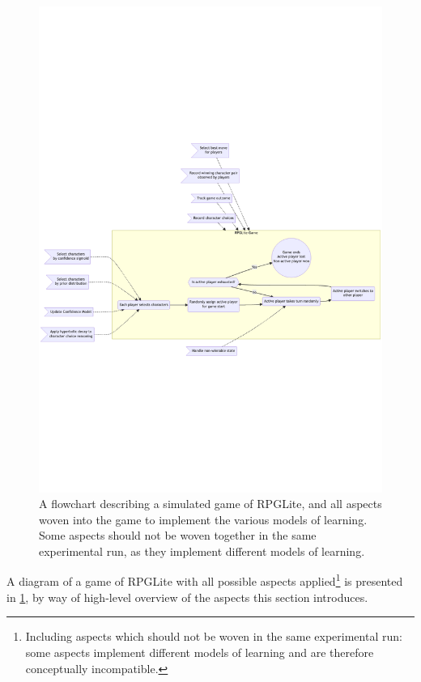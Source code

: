 \begin{figure}
  \centering
  \includegraphics[width=\columnwidth]{60_optimisation_with_aspects/diagrams/aspect_applied_model.png}
  \caption{A flowchart describing a simulated game of RPGLite, and all aspects woven into the game to implement the various models of learning. Some aspects should not be woven together in the same experimental run, as they implement different models of learning.}
  \label{fig:all_aspects_applied}
\end{figure}

A diagram of a game of RPGLite with all possible aspects
applied\footnote{Including aspects which should not be woven in the same
experimental run: some aspects implement different models of learning and are
therefore conceptually incompatible.} is
presented in \cref{fig:all_aspects_applied}, by way of high-level overview of
the aspects this section introduces.

